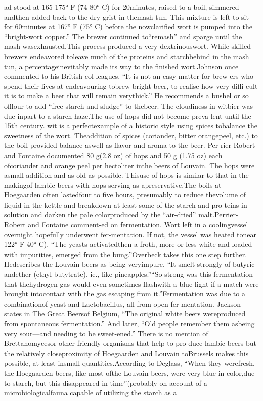 \documentclass[a4paper,parskip=half]{scrartcl}
\begin{document}
\parencite[29]{Sparrow2002} 

ad stood at 165-175° F (74-80° C) for 20minutes, raised to a boil, simmered andthen added back to the dry grist in themash tun. This mixture is left to sit for 60minutes at 167° F (75° C) before the nowclarified wort is pumped into the “bright-wort copper.” The brewer continued to“remash” and sparge until the mash wasexhausted.This process produced a very dextrinouswort. While skilled brewers endeavored toleave much of the proteins and starchbehind in the mash tun, a percentageinevitably made its way to the finished wort.Johnson once commented to his British col-leagues, “It is not an easy matter for brew-ers who spend their lives at endeavouring tobrew bright beer, to realise how very diffi-cult it is to make a beer that will remain verythick.” He recommends a bushel or so offlour to add “free starch and sludge” to thebeer. The cloudiness in witbier was due inpart to a starch haze.The use of hops did not become preva-lent until the 15th century. wit is a perfectexample of a historic style using spices tobalance the sweetness of the wort. Theaddition of spices (coriander, bitter orangepeel, etc.) to the boil provided balance aswell as flavor and aroma to the beer. Per-rier-Robert and Fontaine documented 80 g(2.8 oz) of hops and 50 g (1.75 oz) each ofcoriander and orange peel per hectoliter inthe beers of Louvain. The hops were asmall addition and as old as possible. Thisuse of hops is similar to that in the makingof lambic beers with hops serving as apreservative.The boils at Hoegaarden often lastedfour to five hours, presumably to reduce thevolume of liquid in the kettle and breakdown at least some of the starch and pro-teins in solution and darken the pale colorproduced by the “air-dried” malt.Perrier-Robert and Fontaine comment-ed on fermentation. Wort left in a coolingvessel overnight hopefully underwent fer-mentation. If not, the vessel was heated tonear 122° F 40° C). “The yeasts activatedthen a froth, more or less white and loaded
with impurities, emerged from the bung.”Overbeck takes this one step further. Hedescribes the Louvain beers as being veryimpure. “It smelt strongly of butyric andether (ethyl butytrate), ie., like pineapples.”“So strong was this fermentation that thehydrogen gas would even sometimes flashwith a blue light if a match were brought intocontact with the gas escaping from it.”Fermentation was due to a combinationof yeast and Lactobacillus, all from open fer-mentation. Jackson states in The Great Beersof Belgium, “The original white beers wereproduced from spontaneous fermentation.”
And later, “Old people remember them asbeing very sour—and needing to be sweet-ened.” There is no mention of Brettanomycesor other friendly organisms that help to pro-duce lambic beers but the relatively closeproximity of Hoegaarden and Louvain toBrussels makes this possible, at least insmall quantities.According to Deglass, “When they werefresh, the Hoegaarden beers, like most ofthe Louvain beers, were very blue in color,due to starch, but this disappeared in time”(probably on account of a microbiologicalfauna capable of utilizing the starch as a
\end{document}
